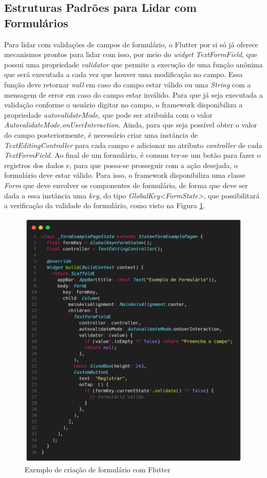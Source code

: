 \documentclass[12pt, %
openright, 
oneside, %
a4paper,    %
brazil]{facom-ufu-abntex2}
\begin{document}
\subsection{Estruturas Padrões para Lidar com Formulários}

Para lidar com validações de campos de formulário, o Flutter por si só já oferece mecanismos prontos para lidar com isso, por meio do \textit{widget} \textit{TextFormField}, que possui uma propriedade \textit{validator} que permite a execução de uma função anônima que será executada a cada vez que houver uma modificação no campo. Essa função deve retornar \textit{null} em caso do campo estar válido ou uma \textit{String} com a mensagem de error em caso do campo estar inválido. Para que já seja executada a validação conforme o usuário digitar no campo, o framework disponibiliza a propriedade \textit{autovalidateMode}, que pode ser atribuída com o valor \textit{AutovalidateMode.onUserInteraction}. Ainda, para que seja possível obter o valor do campo posteriormente, é necessário criar uma instância de \textit{TextEditingController} para cada campo e adicionar no atributo \textit{controller} de cada \textit{TextFormField}. Ao final de um formulário, é comum ter-se um botão para fazer o registros dos dados e, para que possa-se prosseguir com a ação desejada, o formulário deve estar válido. Para isso, o framework disponibiliza uma classe \textit{Form} que deve envolver os componentes de formulário, de forma que deve ser dada a essa instância uma \textit{key}, do tipo \textit{GlobalKey<FormState>}, que possibilitará a verificação da validade do formulário, como visto na Figura \ref{fig:example_form}.

\begin{figure}[ht]
    \centering
    \includegraphics[width=.65\textwidth, trim={0 30 0 100}, clip]{figures/forms/example_form.png}
    \caption{Exemplo de criação de formulário com Flutter}
    \label{fig:example_form}
\end{figure}
\end{document}
